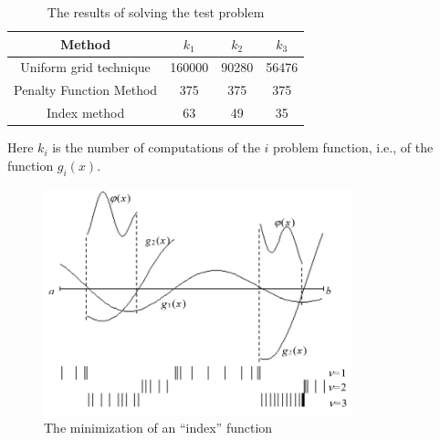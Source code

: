 \begin{table}
  \caption{The results of solving the test problem}
\begin{center}
  \label{tab4:exp_results}
  \begin{tabular}{cccc}
    \hline
    Method & $k_1$ & $k_2$ & $k_3$ \\ \hline
    Uniform grid technique  & 160000 & 90280 & 56476 \\
    Penalty Function Method &  375 & 375 & 375 \\
    Index method & 63 & 49 & 35 \\ \hline
  \end{tabular}
\end{center}
\end{table}

Here $k_i$ is the number of computations of the $i$ problem function, i.e., of the function $g_i(x )$.
\begin{figure}[ht]
  \centering
  \includegraphics[width=0.8\textwidth]{figures/4_6.png}
  \caption{The minimization of an ``index'' function}
  \label{fig:4_6}
\end{figure}

